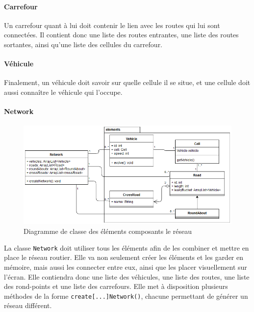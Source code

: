 \documentclass[a4paper,11pt, titlepage]{extarticle}
\begin{document}
\paragraph{Carrefour}

Un carrefour quant à lui doit contenir le lien avec les routes qui lui sont connectées. Il contient donc une liste des routes entrantes, une liste des routes sortantes, ainsi qu'une liste des cellules du carrefour.

\paragraph{Véhicule}

Finalement, un véhicule doit savoir sur quelle cellule il se situe, et une cellule doit aussi connaître le véhicule qui l'occupe.

\paragraph{Network}

\begin{figure}[!h]
\begin{center}
\includegraphics[width=13cm]{elements_diagram.png}
\caption{Diagramme de classe des éléments composants le réseau}
\label{imgElements}
\end{center}
\end{figure}

La classe \texttt{Network} doit utiliser tous les éléments afin de les combiner et mettre en place le réseau routier. Elle va non seulement créer les éléments et les garder en mémoire, mais aussi les connecter entre eux, ainsi que les placer visuellement sur l'écran. Elle contiendra donc une liste des véhicules, une liste des routes, une liste des rond-points et une liste des carrefours. Elle met à disposition plusieurs méthodes de la forme \texttt{create[...]Network()}, chacune permettant de générer un réseau différent.
\end{document}
